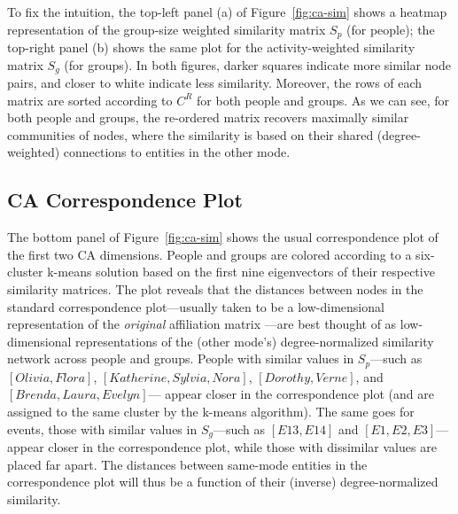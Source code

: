 \documentclass[a4paper,fleqn]{cas-sc}
\begin{document}
To fix the intuition, the top-left panel (a) of Figure~\ref{fig:ca-sim} shows a heatmap representation of the group-size weighted similarity matrix $S_p$ (for people); the top-right panel (b) shows the same plot for the activity-weighted similarity matrix $S_g$ (for groups). In both figures, darker squares indicate more similar node pairs, and closer to white indicate less similarity. Moreover, the rows of each matrix are sorted according to $C^R$ for both people and groups. As we can see, for both people and groups, the re-ordered matrix recovers maximally similar communities of nodes, where the similarity is based on their shared (degree-weighted) connections to entities in the other mode. 

\subsection{CA Correspondence Plot}
The bottom panel of Figure~\ref{fig:ca-sim} shows the usual correspondence plot of the first two CA dimensions. People and groups are colored according to a six-cluster k-means solution based on the first nine eigenvectors of their respective similarity matrices. The plot reveals that the distances between nodes in the standard correspondence plot---usually taken to be a low-dimensional representation of the \textit{original} affiliation matrix \citep{borgatti1997network}---are best thought of as low-dimensional representations of the (other mode's) degree-normalized similarity network across people and groups. People with similar values in $S_p$---such as $\left[Olivia, Flora\right]$,  $\left[Katherine, Sylvia, Nora\right]$, $\left[Dorothy, Verne\right]$, and $\left[Brenda, Laura, Evelyn\right]$--- appear closer in the correspondence plot (and are assigned to the same cluster by the k-means algorithm). The same goes for events, those with similar values in $S_g$---such as $\left[E13, E14\right]$ and $\left[E1, E2, E3\right]$---appear closer in the correspondence plot, while those with dissimilar values are placed far apart. The distances between same-mode entities in the correspondence plot will thus be a function of their (inverse) degree-normalized similarity.
\end{document}
